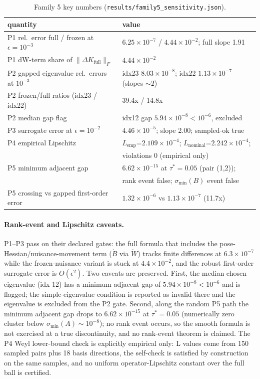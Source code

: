 \documentclass[12pt]{article}
\begin{document}
\begin{table}[ht]
\centering
\small
\caption{Family 5 key numbers (\texttt{results/family5\_sensitivity.json}).}
\label{tab:f5}
\begin{tabular}{l l}
\toprule
quantity & value \\
\midrule
P1 rel.\ error full / frozen at $\epsilon=10^{-3}$ &
$6.25\times10^{-7}$ / $4.44\times10^{-2}$; full slope 1.91 \\
P1 dW-term share of $\|\Delta K_{\mathrm{full}}\|_F$ & $4.44\times10^{-2}$ \\
P2 gapped eigenvalue rel.\ errors at $10^{-3}$ &
idx23 $8.03\times10^{-8}$; idx22 $1.13\times10^{-7}$ (slopes $\sim2$) \\
P2 frozen/full ratios (idx23 / idx22) & 39.4x / 14.8x \\
P2 median gap flag & idx12 gap $5.94\times10^{-8}<10^{-6}$, excluded \\
P3 surrogate error at $\epsilon=10^{-2}$ & $4.46\times10^{-5}$; slope 2.00; sampled-ok true \\
P4 empirical Lipschitz &
$L_{\mathrm{emp}}$=$2.109\times10^{-4}$; $L_{\mathrm{nominal}}$=$2.242\times10^{-4}$; \\
 & violations 0 (empirical only) \\
P5 minimum adjacent gap & $6.62\times10^{-15}$ at $\tau^*=0.05$ (pair (1,2)); \\
 & rank event false; $\sigma_{\min}(B)$ event false \\
P5 crossing vs gapped first-order error &
$1.32\times10^{-6}$ vs $1.13\times10^{-7}$ (11.7x) \\
\bottomrule
\end{tabular}
\end{table}

\paragraph{Rank-event and Lipschitz caveats.}
P1--P3 pass on their declared gates: the full formula that includes the
pose-Hessian/nuisance-movement term ($\dot B$ via $\dot W$) tracks finite
differences at $6.3\times10^{-7}$ while the frozen-nuisance variant is stuck at
$4.4\times10^{-2}$, and the robust first-order surrogate error is
$O(\epsilon^2)$. Two caveats are preserved. First, the median chosen
eigenvalue (idx 12) has a minimum adjacent gap of
$5.94\times10^{-8}<10^{-6}$ and is flagged; the simple-eigenvalue condition is
reported as invalid there and the eigenvalue is excluded from the P2 gate.
Second, along the random P5 path the minimum adjacent gap drops to
$6.62\times10^{-15}$ at $\tau^*=0.05$ (numerically zero cluster below
$\sigma_{\min}(A)\sim10^{-8}$); no rank event occurs, so the smooth formula is
not exercised at a true discontinuity, and no rank-event theorem is claimed.
The P4 Weyl lower-bound check is explicitly empirical only: L values come from
150 sampled pairs plus 18 basis directions, the self-check is satisfied by
construction on the same samples, and no uniform operator-Lipschitz constant
over the full ball is certified.
\end{document}
